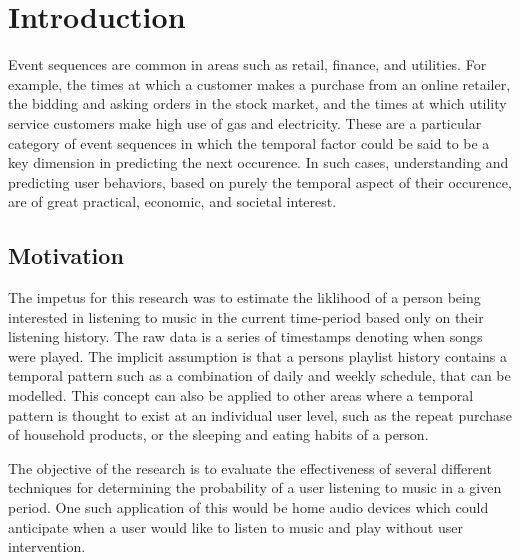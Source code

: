 
\chapter{Introduction} %

\label{Chapter1} %


\newcommand{\keyword}[1]{\textbf{#1}}
\newcommand{\tabhead}[1]{\textbf{#1}}
\newcommand{\code}[1]{\texttt{#1}}
\newcommand{\file}[1]{\texttt{\bfseries#1}}
\newcommand{\option}[1]{\texttt{\itshape#1}}


Event sequences are common in areas such as retail, finance, and utilities.
For example, the times at which a customer makes a purchase from an online retailer, the bidding and asking orders in the
stock market, and the times at which utility service customers make high use of gas and electricity. These are a particular category of event sequences in which the temporal factor could be said to be a key dimension in predicting the next occurence. In such cases, understanding and predicting user behaviors, based on purely the temporal aspect of their occurence, are of great practical, economic, and societal interest.

\section{Motivation}
The impetus for this research was to estimate the liklihood of a person being interested in listening to music in the current time-period based only on their listening history. The raw data is a series of timestamps denoting when songs were played. The implicit assumption is that a persons playlist history contains a temporal pattern such as a combination of daily and weekly schedule, that can be modelled. This concept can also be applied to other areas where a temporal pattern is thought to exist at an individual user level, such as the repeat purchase of household products, or the sleeping and eating habits of a person.

The objective of the research is to evaluate the effectiveness of several different techniques for determining the probability of a user listening to music in a given period. One such application of this would be home audio devices which could anticipate when a user would like to listen to music and play without user intervention.

